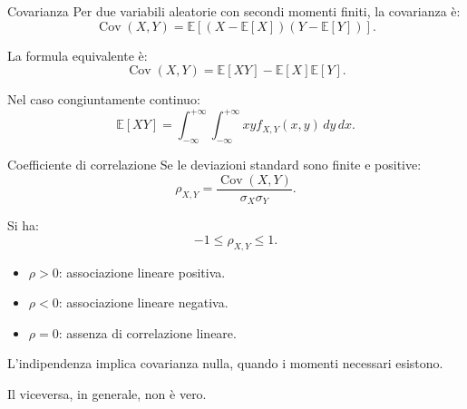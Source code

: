 \begin{definition}{Covarianza}
Per due variabili aleatorie
con secondi momenti finiti,
la covarianza è:
\[
\boxed{
\operatorname{Cov}(X,Y)
=
\mathbb{E}[
(X-\mathbb{E}[X])
(Y-\mathbb{E}[Y])
].
}
\]
\end{definition}

La formula equivalente è:
\[
\boxed{
\operatorname{Cov}(X,Y)
=
\mathbb{E}[XY]
-
\mathbb{E}[X]\mathbb{E}[Y].
}
\]

Nel caso congiuntamente continuo:
\[
\mathbb{E}[XY]
=
\int_{-\infty}^{+\infty}
\int_{-\infty}^{+\infty}
xyf_{X,Y}(x,y)\,dy\,dx.
\]

\begin{definition}{Coefficiente di correlazione}
Se le deviazioni standard
sono finite e positive:
\[
\boxed{
\rho_{X,Y}
=
\frac{\operatorname{Cov}(X,Y)}
{\sigma_X\sigma_Y}.
}
\]
\end{definition}

Si ha:
\[
-1\leq\rho_{X,Y}\leq1.
\]

\begin{itemize}
    \item $\rho>0$: associazione lineare positiva.
    \item $\rho<0$: associazione lineare negativa.
    \item $\rho=0$: assenza di correlazione lineare.
\end{itemize}

L'indipendenza implica
covarianza nulla, quando
i momenti necessari esistono.

Il viceversa, in generale,
non è vero.
